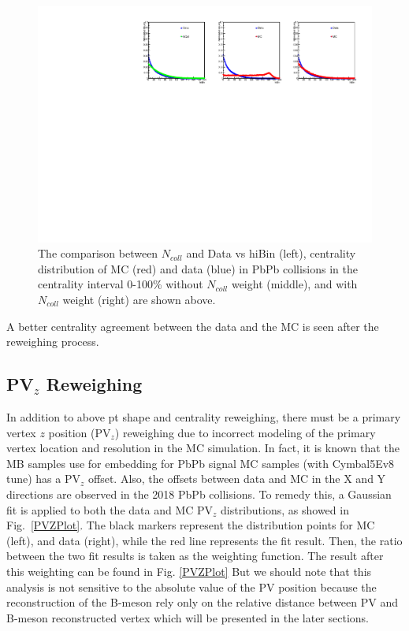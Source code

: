 \begin{figure}[hbtp]
\begin{center}
\includegraphics[width=1.10\textwidth]{Figures/Chapter4/CentralityWeight.pdf}
\caption{The comparison between $N_{coll}$ and Data vs hiBin (left), centrality distribution of MC (red) and data (blue) in PbPb collisions in the centrality interval 0-100\% without $N_{coll}$ weight (middle), and with $N_{coll}$ weight (right) are shown above.}
\label{CentComp}
\end{center}
\end{figure} 


A better centrality agreement between the data and the MC is seen after the reweighing process. 

\subsection{PV$_{z}$ Reweighing}


In addition to above pt shape and centrality reweighing, there must be a primary vertex $z$ position (PV$_{z}$) reweighing due to incorrect modeling of the primary vertex location and resolution in the MC simulation. In fact, it is known that the MB samples use for embedding for PbPb signal MC samples (with Cymbal5Ev8 tune) has a PV$_{z}$ offset. Also, the offsets between data and MC in the X and Y directions are observed in the 2018 PbPb collisions. To remedy this, a Gaussian fit is applied to both the data and MC PV$_{z}$ distributions, as showed in Fig.~\ref{PVZPlot}. The black markers represent the distribution points for MC (left), and data (right), while the red line represents the fit result. Then, the ratio between the two fit results is taken as the weighting function. The result after this weighting can be found in Fig. \ref{PVZPlot} But we should note that this analysis is not sensitive to the absolute value of the PV position because the reconstruction of the B-meson rely only on the relative distance between PV and B-meson reconstructed vertex which will be presented in the later sections.

